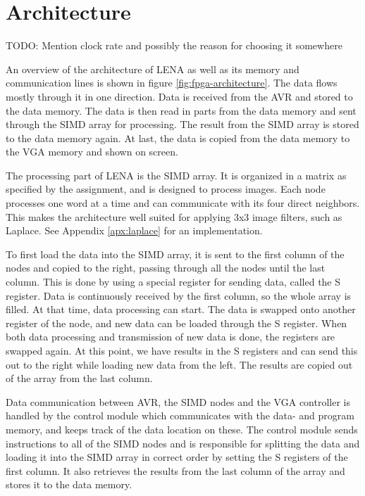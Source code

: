 \section{Architecture}



{\sc TODO: \color{red} Mention clock rate and possibly the reason for choosing
  it somewhere}

An overview of the architecture of \ac{LENA} as well as its memory and
communication lines is shown in figure \ref{fig:fpga-architecture}. The data
flows mostly through it in one direction. Data is received from the AVR and
stored to the data memory. The data is then read in parts from the data memory
and sent through the \ac{SIMD} array for processing. The result from the
\ac{SIMD} array is stored to the data memory again. At last, the data is copied
from the data memory to the \ac{VGA} memory and shown on screen.

The processing part of \ac{LENA} is the \ac{SIMD} array. It is organized in a
matrix as specified by the assignment, and is designed to process images. Each
node processes one word at a time and can communicate with its four direct
neighbors. This makes the architecture  well suited for applying 3x3
image filters, such as Laplace. See Appendix \ref{apx:laplace} for an
implementation.

To first load the data into the \ac{SIMD} array, it is sent to the first column of
the nodes and copied to the right, passing through all the nodes until the last
column.  This is done by using a special register for sending data, called the
S register. Data is continuously received by the first column, so the whole array
is filled. At that time, data processing can start. The data is swapped onto
another register of the node, and new data can be loaded through the S register.
When both data processing and transmission of new data is done, the registers
are swapped again. At this point, we have results in the S registers and can
send this out to the right while loading new data from the left. The results are
copied out of the array from the last column.

Data communication between AVR, the \ac{SIMD} nodes and the \ac{VGA}
controller is handled by the control module which communicates with the data-
and program memory, and keeps track of the data location on these. The control
module sends instructions to all of the \ac{SIMD} nodes and is responsible for
splitting the data and loading it into the \ac{SIMD} array in correct order by
setting the S registers of the first column. It also retrieves the results from
the last column of the array and stores it to the data memory.

